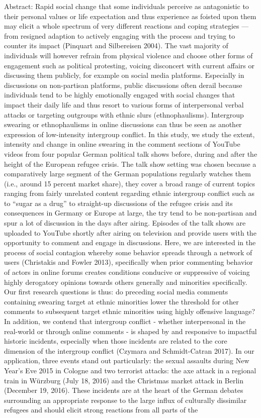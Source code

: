 Abstract: Rapid social change that some individuals perceive as antagonistic to their personal values or life expectation and thus experience as foisted upon them may elicit a whole spectrum of very different reactions and coping strategies --- from resigned adaption to actively engaging with the process and trying to counter its impact (Pinquart and Silbereisen 2004). The vast majority of individuals will however refrain from physical violence and choose other forms of engagement such as political protesting, voicing disconcert with current affairs or discussing them publicly, for example on social media platforms. Especially in discussions on non-partisan platforms, public discussions often derail because individuals tend to be highly emotionally engaged with social changes that impact their daily life and thus resort to various forms of interpersonal verbal attacks or targeting outgroups with ethnic slurs (ethnophaulisms). Intergroup swearing or ethnophaulisms in online discussions can thus be seen as another expression of low-intensity intergroup conflict. In this study, we study the extent, intensity and change in online swearing in the comment sections of YouTube videos from four popular German political talk shows before, during and after the height of the European refugee crisis. The talk show setting was chosen because a comparatively large segment of the German populations regularly watches them (i.e., around 15 percent market share), they cover a broad range of current topics ranging from fairly unrelated content regarding ethnic intergroup conflict such as to ``sugar as a drug'' to straight-up discussions of the refugee crisis and its consequences in Germany or Europe at large, the try tend to be non-partisan and spur a lot of discussion in the days after airing. Episodes of the talk shows are uploaded to YouTube shortly after airing on television and provide users with the opportunity to comment and engage in discussions. Here, we are interested in the process of social contagion whereby some behavior spreads through a network of users (Christakis and Fowler 2013), specifically when prior commenting behavior of actors in online forums creates conditions conducive or suppressive of voicing highly derogatory opinions towards others generally and minorities specifically. Our first research questions is thus: do preceding social media comments containing swearing target at ethnic minorities lower the threshold for other comments to subsequent target ethnic minorities using highly offensive language? In addition, we contend that intergroup conflict - whether interpersonal in the real-world or through online comments - is shaped by and responsive to impactful historic incidents, especially when those incidents are related to the core dimension of the intergroup conflict (Czymara and Schmidt-Catran 2017). In our application, three events stand out particularly: the sexual assaults during New Year's Eve 2015 in Cologne and two terrorist attacks: the axe attack in a regional train in Würzburg (July 18, 2016) and the Christmas market attack in Berlin (December 19, 2016). These incidents are at the heart of the German debates surrounding an appropriate response to the large influx of culturally dissimilar refugees and should elicit strong reactions from all parts of the 
